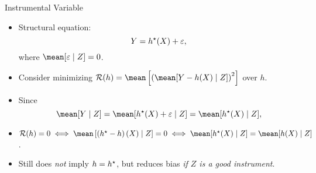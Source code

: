 \documentclass[aspectratio=169]{beamer}
\begin{document}
    \begin{frame}{Instrumental Variable}
       \begin{itemize}
           \item<1->  Structural equation:
               \begin{equation*}
                   Y = h^{ \star } ( X ) + \varepsilon
               ,\end{equation*}
               where $ \mean [ \varepsilon \mid Z ] = 0 $.
           \item<2-> Consider minimizing $ \risk ( h ) = \mean \left[ \left( \mean [ Y - h ( X ) \mid Z ] \right)^2 \right] $ over $ h $.
            \item<3-> Since
                \begin{equation*}
                    \mean [ Y \mid Z ] = \mean [ \hstar ( X ) + \varepsilon \mid Z ] = \mean [ \hstar ( X ) \mid Z ]
                ,\end{equation*}
                \item<5-> $ \risk ( h ) = 0 \iff \mean \left[ \left( \hstar - h \right) ( X ) \mid Z \right] = 0 \iff \mean [ \hstar ( X ) \mid Z ] = \mean [ h ( X ) \mid Z ] $.
                \item<6-> Still does \emph{not} imply $ h = h^{ \star } $, but reduces bias \emph{if $ Z $ is a good instrument}.
       \end{itemize} 
    \end{frame}
\end{document}
